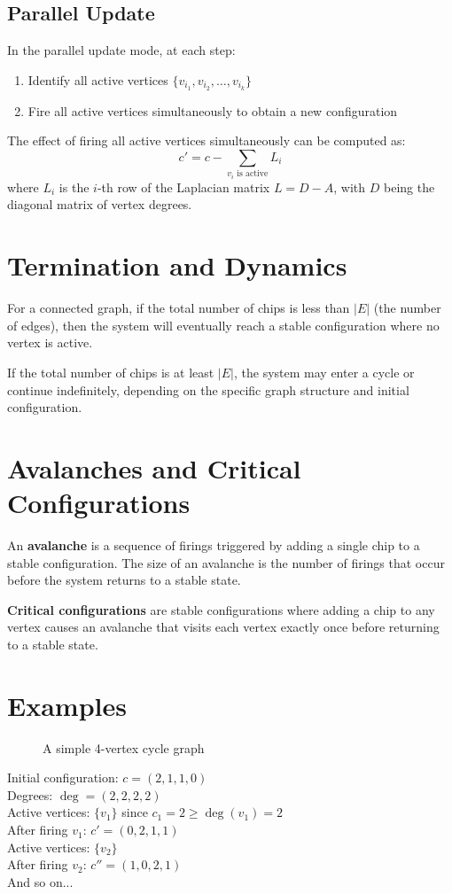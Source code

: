 \documentclass{article}
\begin{document}
\subsection{Parallel Update}
In the parallel update mode, at each step:
\begin{enumerate}
  \item Identify all active vertices $\{v_{i_1}, v_{i_2}, \ldots, v_{i_k}\}$
  \item Fire all active vertices simultaneously to obtain a new configuration
\end{enumerate}

The effect of firing all active vertices simultaneously can be computed as:
\[
c' = c - \sum_{v_i \text{ is active}} L_i
\]
where $L_i$ is the $i$-th row of the Laplacian matrix $L = D - A$, with $D$ being the diagonal matrix of vertex degrees.

\section{Termination and Dynamics}

For a connected graph, if the total number of chips is less than $|E|$ (the number of edges), then the system will eventually reach a stable configuration where no vertex is active.

If the total number of chips is at least $|E|$, the system may enter a cycle or continue indefinitely, depending on the specific graph structure and initial configuration.

\section{Avalanches and Critical Configurations}

An \textbf{avalanche} is a sequence of firings triggered by adding a single chip to a stable configuration. The size of an avalanche is the number of firings that occur before the system returns to a stable state.

\textbf{Critical configurations} are stable configurations where adding a chip to any vertex causes an avalanche that visits each vertex exactly once before returning to a stable state.

\section{Examples}

\begin{figure}[h]
\centering
{}
\caption{A simple 4-vertex cycle graph}
\end{figure}

Initial configuration: $c = (2, 1, 1, 0)$\\
Degrees: $\deg = (2, 2, 2, 2)$\\
Active vertices: $\{v_1\}$ since $c_1 = 2 \geq \deg(v_1) = 2$\\
After firing $v_1$: $c' = (0, 2, 1, 1)$\\
Active vertices: $\{v_2\}$\\
After firing $v_2$: $c'' = (1, 0, 2, 1)$\\
And so on...
\end{document}
